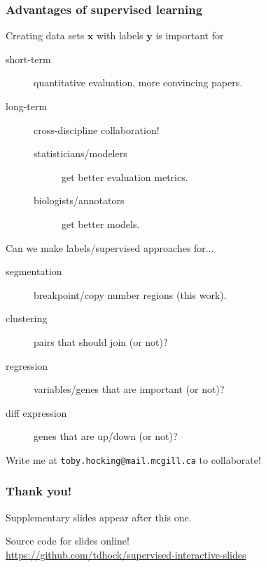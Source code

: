 \documentclass{beamer}
\begin{document}
\begin{frame} 
  \frametitle{Advantages of supervised learning}
  Creating data sets $\mathbf x$ with labels $\mathbf y$ is important for
  \begin{description}
  \item[short-term] quantitative evaluation, more convincing papers.
  \item[long-term] cross-discipline collaboration!
    \begin{description}
    \item[statisticians/modelers] get better evaluation
    metrics.
    \item[biologists/annotators] get
    better models.
    \end{description}
  \end{description}

  Can we make labels/supervised approaches for...
  \begin{description}
  \item[segmentation] breakpoint/copy number regions (this work).
  \item[clustering] pairs that should join (or not)?
  \item[regression] variables/genes that are important (or not)?
  \item[diff expression] genes that are up/down (or not)?
  \end{description}
  Write me at \texttt{toby.hocking@mail.mcgill.ca} to collaborate!
\end{frame}

\begin{frame}
  \frametitle{Thank you!}
  Supplementary slides appear after this one.

  \vskip 1cm

  Source code for slides online!\\
  \small
  \url{https://github.com/tdhock/supervised-interactive-slides}
\end{frame}
\end{document}
